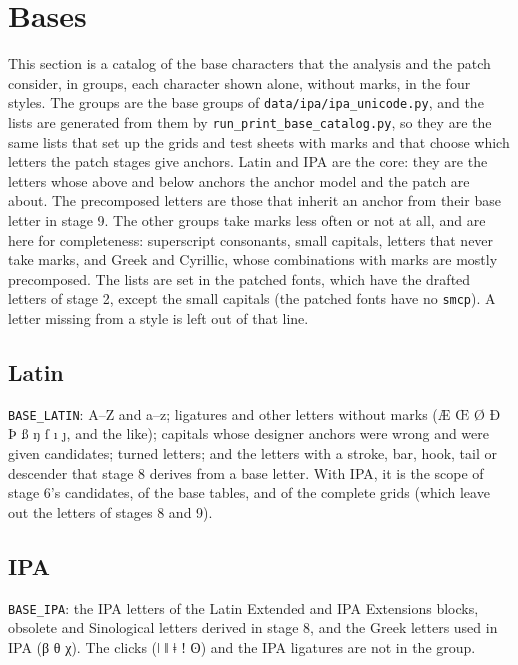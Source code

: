 \documentclass[landscape]{article}
\begin{document}
\newpage
\section*{Bases}

This section is a catalog of the base characters that the analysis and the patch consider,
in groups, each character shown alone, without marks, in the four styles.
The groups are the base groups of \texttt{data/ipa/ipa\_unicode.py},
and the lists are generated from them by \texttt{run\_print\_base\_catalog.py},
so they are the same lists that set up the grids and test sheets with marks
and that choose which letters the patch stages give anchors.
Latin and IPA are the core: they are the letters whose above and below anchors the anchor model
and the patch are about.
The precomposed letters are those that inherit an anchor from their base letter in stage 9.
The other groups take marks less often or not at all,
and are here for completeness: superscript consonants, small capitals,
letters that never take marks, and Greek and Cyrillic, whose combinations with marks are mostly precomposed.
The lists are set in the patched fonts, which have the drafted letters of stage 2,
except the small capitals (the patched fonts have no \texttt{smcp}).
A letter missing from a style is left out of that line.

\subsection*{Latin}

\texttt{BASE\_LATIN}: A--Z and a--z; ligatures and other letters without marks (Æ Œ Ø Ð Þ ß ŋ ſ ı ȷ, and the like);
capitals whose designer anchors were wrong and were given candidates;
turned letters;
and the letters with a stroke, bar, hook, tail or descender that stage 8 derives from a base letter.
With IPA, it is the scope of stage 6's candidates, of the base tables, and of the complete grids
(which leave out the letters of stages 8 and 9).



\subsection*{IPA}

\texttt{BASE\_IPA}: the IPA letters of the Latin Extended and IPA Extensions blocks,
obsolete and Sinological letters derived in stage 8,
and the Greek letters used in IPA (β θ χ).
The clicks (ǀ ǁ ǂ ǃ ʘ) and the IPA ligatures are not in the group.
\end{document}
